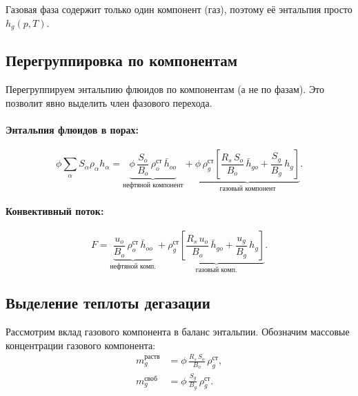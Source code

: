 \documentclass[12pt,a4paper]{article}
\begin{document}
Газовая фаза содержит только один компонент (газ), поэтому её энтальпия
просто $h_g(p,T)$.

\subsection{Перегруппировка по компонентам}\label{ssec:regroup}

Перегруппируем энтальпию флюидов по компонентам (а не по фазам).
Это позволит явно выделить член фазового перехода.

\paragraph{Энтальпия флюидов в порах:}
\begin{equation}\label{eq:H_fluids}
  \phi\sum_\alpha S_\alpha\rho_\alpha h_\alpha
  = \underbrace{\phi\,\frac{S_o}{B_o}\,\rho_o^{\text{ст}}\,
      \bar{h}_{oo}}_{\text{нефтяной компонент}}
    + \underbrace{\phi\,\rho_g^{\text{ст}}\!\left[
        \frac{R_s\,S_o}{B_o}\,\bar{h}_{go}
        + \frac{S_g}{B_g}\,h_g
      \right]}_{\text{газовый компонент}}.
\end{equation}

\paragraph{Конвективный поток:}
\begin{equation}\label{eq:F_components}
  F = \underbrace{\frac{u_o}{B_o}\,\rho_o^{\text{ст}}\,
        \bar{h}_{oo}}_{\text{нефтяной комп.}}
      + \underbrace{\rho_g^{\text{ст}}\!\left[
          \frac{R_s\,u_o}{B_o}\,\bar{h}_{go}
          + \frac{u_g}{B_g}\,h_g
        \right]}_{\text{газовый комп.}}.
\end{equation}

\subsection{Выделение теплоты дегазации}\label{ssec:degas_heat}

Рассмотрим вклад газового компонента в баланс энтальпии. Обозначим
массовые концентрации газового компонента:
\begin{align}
  m_g^{\text{раств}} &= \phi\,\frac{R_s\,S_o}{B_o}\,
    \rho_g^{\text{ст}}, \label{eq:mg_dissolved} \\
  m_g^{\text{своб}} &= \phi\,\frac{S_g}{B_g}\,
    \rho_g^{\text{ст}}. \label{eq:mg_free}
\end{align}
\end{document}
